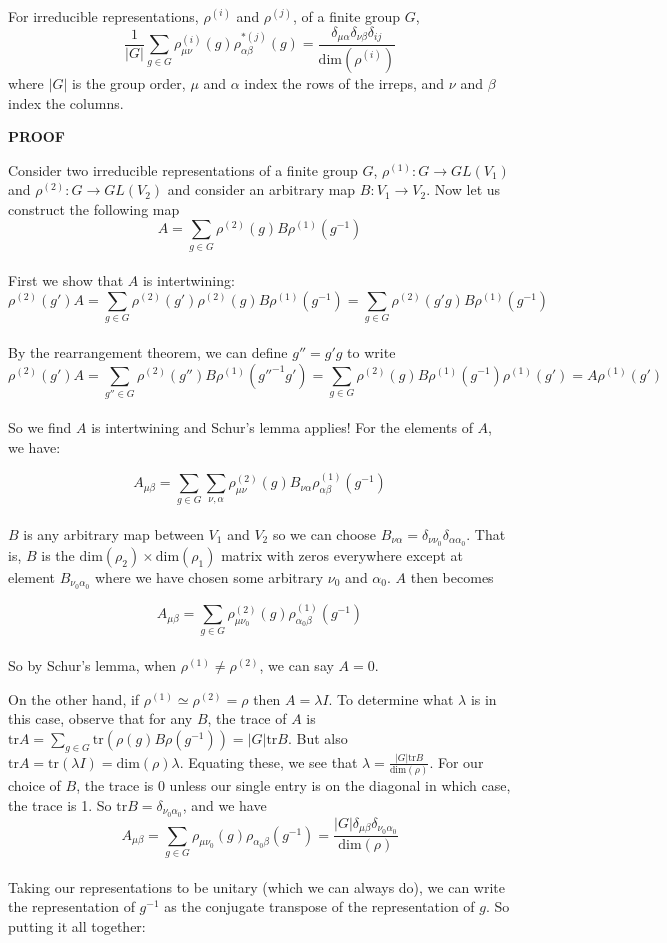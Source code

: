 \documentclass[9 pt]{report}
\begin{document}
\begin{tcolorbox}
	For irreducible representations, $\rho^{(i)}$ and $\rho^{(j)}$, of a finite group $G$, 
	$$ \frac{1}{|G|}\sum_{g\in G} \rho^{(i)}_{\mu\nu}(g)\rho^{*(j)}_{\alpha\beta} (g) = \frac{\delta_{\mu\alpha}\delta_{\nu\beta}\delta_{ij}}{\text{dim}(\rho^{(i)})} $$
	where $|G|$ is the group order, $\mu$ and $\alpha$ index the rows of the irreps, and $\nu$ and $\beta$ index the columns.
\end{tcolorbox}

\begin{center}
	\textbf{PROOF}
\end{center}
Consider two irreducible representations of a finite group $G$, $\rho^{(1)}:G\rightarrow GL(V_1)$ and $\rho^{(2)}: G\rightarrow GL(V_2)$ and consider an arbitrary map $B:V_1\rightarrow V_2$. Now let us construct the following map
$$ A = \sum_{g\in G} \rho^{(2)}(g)B\rho^{(1)}(g^{-1}) $$
\\
First we show that $A$ is intertwining: 
$$ \rho^{(2)}(g')A = \sum_{g\in G} \rho^{(2)}(g')\rho^{(2)}(g)B\rho^{(1)}(g^{-1}) = \sum_{g\in G} \rho^{(2)}(g'g)B\rho^{(1)}(g^{-1}) $$
\\
By the rearrangement theorem, we can define $g''=g'g$ to write
$$ \rho^{(2)}(g')A = \sum_{g''\in G} \rho^{(2)}(g'')B\rho^{(1)}(g''^{-1}g') = \sum_{g\in G} \rho^{(2)}(g)B\rho^{(1)}(g^{-1})\rho^{(1)}(g') = A\rho^{(1)}(g') $$
\\
So we find $A$ is intertwining and Schur's lemma applies! For the elements of $A$, we have:

$$ A_{\mu\beta} = \sum_{g\in G}\sum_{\nu,\alpha}\rho^{(2)}_{\mu\nu}(g)B_{\nu\alpha}\rho^{(1)}_{\alpha\beta}(g^{-1}) $$
\\
$B$ is any arbitrary map between $V_1$ and $V_2$ so we can choose $B_{\nu\alpha}=\delta_{\nu \nu_0}\delta_{\alpha\alpha_0}$.  That is, $B$ is the $\text{dim}(\rho_2)\times\text{dim}(\rho_1)$ matrix with zeros everywhere except at element $B_{\nu_0\alpha_0}$ where we have chosen some arbitrary $\nu_0$ and $\alpha_0$. $A$ then becomes

$$ A_{\mu\beta} = \sum_{g\in G} \rho^{(2)}_{\mu\nu_0}(g)\rho^{(1)}_{\alpha_0\beta} (g^{-1})$$
\\
So by Schur's lemma, when $\rho^{(1)}\neq\rho^{(2)}$, we can say $A=0$.

On the other hand, if $\rho^{(1)}\simeq \rho^{(2)}=\rho$ then $A=\lambda I$. To determine what $\lambda$ is in this case, observe that for any $B$, the trace of $A$ is $ \text{tr} A = \sum_{g\in G}\text{tr}(\rho(g)B\rho(g^{-1})) = |G|\text{tr}B $. But also $\text{tr}A=\text{tr}(\lambda I) = \text{dim}(\rho) \lambda$. Equating these, we see that $\lambda = \frac{|G|\text{tr}B }{\text{dim}(\rho)}$. For our choice of $B$, the trace is 0 unless our single entry is on the diagonal in which case, the trace is 1. So $\text{tr}B=\delta_{\nu_0\alpha_0}$, and we have
$$ A_{\mu\beta} = \sum_{g\in G}\rho_{\mu\nu_0}(g)\rho_{\alpha_0\beta}(g^{-1}) = \frac{|G|\delta_{\mu\beta}\delta_{\nu_0\alpha_0} }{\text{dim}(\rho)} $$
\\
Taking our representations to be unitary (which we can always do), we can write the representation of $g^{-1}$ as the conjugate transpose of the representation of $g$. So putting it all together:
\end{document}
